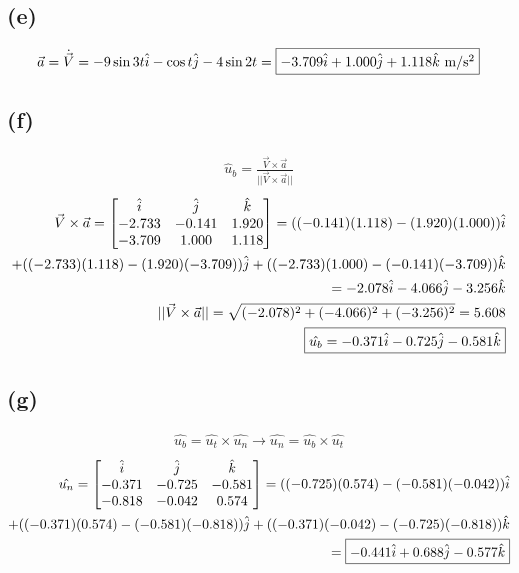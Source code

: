 \documentclass[12 pt]{article}
\begin{document}
\subsection*{(e)}
\begin{align*}
    \vec{a}=\dot{\vec{V}}=-9\sin{3t}\hat{i} - \cos{t}\hat{j} -4\sin{2t}=\fbox{$-3.709\hat{i} + 1.000\hat{j} + 1.118\hat{k}$ m/s$^2$}
\end{align*}

\subsection*{(f)}
\begin{align*}
    \hat{u}_b=\frac{\vec{V}\times \vec{a}}{||\vec{V}\times \vec{a}||}
\end{align*}
\begin{align*}
    \vec{V}\times \vec{a} = \begin{bmatrix}
        \hat{i} & \hat{j} & \hat{k} \\
        -2.733 & -0.141 & 1.920 \\
        -3.709 & 1.000 & 1.118
    \end{bmatrix} = ((-0.141)(1.118) - (1.920)(1.000))\hat{i} \\+ ((-2.733)(1.118) - (1.920)(-3.709))\hat{j} +
    ((-2.733)(1.000) - (-0.141)(-3.709))\hat{k} \\
    = -2.078\hat{i} - 4.066\hat{j} -3.256\hat{k} \\
    ||\vec{V}\times \vec{a}|| = \sqrt{(-2.078)^2 + (-4.066)^2 + (-3.256)^2} = 5.608 \\
    \fbox{$\hat{u_b}=-0.371\hat{i} - 0.725\hat{j} - 0.581\hat{k}$}
\end{align*}

\subsection*{(g)}
\begin{align*}
    \hat{u_b}=\hat{u_t}\times \hat{u_n} \rightarrow \hat{u_n}=\hat{u_b}\times \hat{u_t}
\end{align*}
\begin{align*}
    \hat{u_n} = \begin{bmatrix}
        \hat{i} & \hat{j} & \hat{k} \\
        -0.371 & -0.725 & -0.581 \\
        -0.818 & -0.042 & 0.574
    \end{bmatrix} = ((-0.725)(0.574)-(-0.581)(-0.042))\hat{i} \\+ ((-0.371)(0.574)-(-0.581)(-0.818))\hat{j}
    + ((-0.371)(-0.042)-(-0.725)(-0.818))\hat{k} \\ = \fbox{$-0.441\hat{i} + 0.688\hat{j} -0.577\hat{k}$}
\end{align*}
\end{document}
